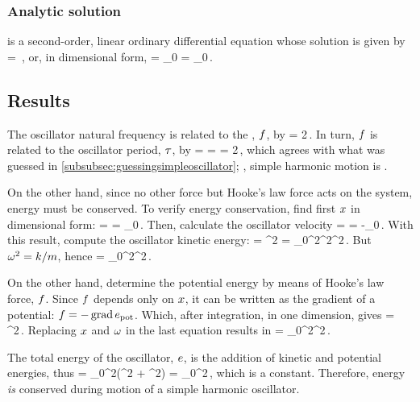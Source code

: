 \subsubsection{Analytic solution}
 is a second-order, linear ordinary differential equation  whose solution is given by
\beq
\scpq\odisp = \cos{}\,,
\eeq
or, in dimensional form,
\beq
\odisp = \odisp_0\cos{}
       = \odisp_0\cos{}\,.
\eeq


\subsection{Results}
The oscillator natural frequency is related to the , $f$, by
\beq
\natfreq = 2\pi\cycfreq\,.
\eeq
In turn, $f$ is related to the oscillator period, $\tau$, by
\beq
\oper =  \implies
\oper = \dfrac{2\pi}{\natfreq} 
      = 2\pi\sqrt{\dfrac{\mass}{\kspring}}\,,
\eeq
which agrees with what was guessed in \cref{subsubsec:guessingsimpleoscillator}; \ie, simple harmonic motion is .

On the other hand, since no other force but Hooke's law force acts on the system, energy must be conserved. To verify energy conservation, find first $x$ in dimensional form:
\beq
\scpq\odisp = \cos{}\implies
\odisp = \odisp_0\cos{}\,.
\eeq
Then, calculate the oscillator velocity
\beq
\lvel = \ovel = -\odisp_0\natfreq\sin{}\,.
\eeq
With this result, compute the oscillator kinetic energy:
\ken = \mass\lvel^2 = \mass\odisp_0^2\natfreq^2\sin^2\,.
\eeq
But $\omega^2 = k/m$, hence
\ken = \kspring\odisp_0^2\sin^2\,.
\eeq

On the other hand, determine the potential energy by means of Hooke's law force, $f$. Since $f$ depends only on $x$, it can be written as the gradient of a potential: $f = -\operatorname{grad}e_\text{pot}$. Which, after integration, in one dimension, gives 
\pen = \kspring\odisp^2\,.
\eeq
Replacing $x$ and $\omega$ in the last equation results in
\pen = \kspring\odisp_0^2\cos^2\,.
\eeq

The total energy of the oscillator, $e$, is the addition of kinetic and potential energies, thus
\ener = \kspring\odisp_0^2\left(\sin^2 + \cos^2\right)\implies
\ener = \kspring\odisp_0^2\,,
\eeq
which is a constant. Therefore, energy \emph{is} conserved during motion of a simple harmonic oscillator.

